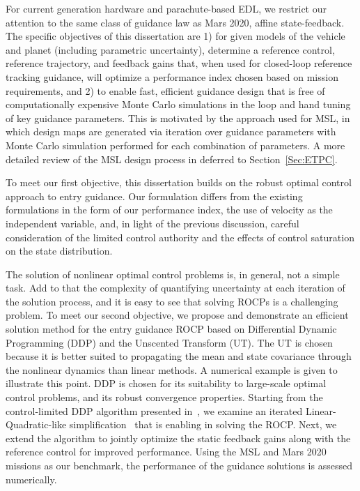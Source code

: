 For current generation hardware and parachute-based EDL, we restrict our attention to the same class of guidance law as Mars 2020, affine state-feedback.
The specific objectives of this dissertation are 1) for given models of the vehicle and planet (including parametric uncertainty), determine a reference control, reference trajectory, and feedback gains that, when used for closed-loop reference tracking guidance, will optimize a performance index chosen based on mission requirements, and 2) to enable fast, efficient guidance design that is free of computationally expensive Monte Carlo simulations in the loop and hand tuning of key guidance parameters. This is motivated by the approach used for MSL, in which design maps are generated via iteration over guidance parameters with Monte Carlo simulation performed for each combination of parameters. A more detailed review of the MSL design process in deferred to Section~\ref{Sec:ETPC}.

To meet our first objective, this dissertation builds on the robust optimal control approach to entry guidance.
Our formulation differs from the existing formulations in the form of our performance index, the use of velocity as the independent variable, and, in light of the previous discussion, careful consideration of the limited control authority and the effects of control saturation on the state distribution.

The solution of nonlinear optimal control problems is, in general, not a simple task. Add to that the complexity of quantifying uncertainty at each iteration of the solution process, and it is easy to see that solving ROCPs is a challenging problem. To meet our second objective, we propose and demonstrate an efficient solution method for the entry guidance ROCP based on Differential Dynamic Programming (DDP) and the Unscented Transform (UT). The UT is chosen because it is better suited to propagating the mean and state covariance through the nonlinear dynamics than linear methods. A numerical example is given to illustrate this point. DDP is chosen for its suitability to large-scale optimal control problems, and its robust convergence properties. Starting from the control-limited DDP algorithm presented in~\cite{DDP_ControlLimited}, we examine an iterated Linear-Quadratic-like simplification~\cite{iLQG} that is enabling in solving the ROCP. Next, we extend the algorithm to jointly optimize the static feedback gains along with the reference control for improved performance. Using the MSL and Mars 2020 missions as our benchmark, the performance of the guidance solutions is assessed numerically. 
  

